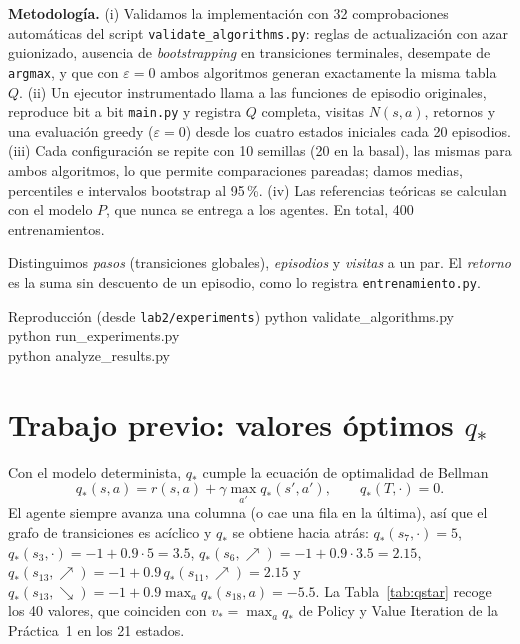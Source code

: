 \documentclass[11pt,a4paper]{article}
\newcommand{\UR}{{\nearrow}}
\newcommand{\DR}{{\searrow}}
\begin{document}
\textbf{Metodología.} (i) Validamos la implementación con 32 comprobaciones automáticas del script \texttt{validate\_\allowbreak algorithms.py}: reglas de actualización con azar guionizado, ausencia de \emph{bootstrapping} en transiciones terminales, desempate de \texttt{argmax}, y que con $\varepsilon=0$ ambos algoritmos generan exactamente la misma tabla $Q$. (ii) Un ejecutor instrumentado llama a las funciones de episodio originales, reproduce bit a bit \texttt{main.py} y registra $Q$ completa, visitas $N(s,a)$, retornos y una evaluación greedy ($\varepsilon=0$) desde los cuatro estados iniciales cada 20 episodios. (iii) Cada configuración se repite con 10 semillas (20 en la basal), las mismas para ambos algoritmos, lo que permite comparaciones pareadas; damos medias, percentiles e intervalos bootstrap al 95\,\%. (iv) Las referencias teóricas se calculan con el modelo $P$, que nunca se entrega a los agentes. En total, 400 entrenamientos.

Distinguimos \emph{pasos} (transiciones globales), \emph{episodios} y \emph{visitas} a un par. El \emph{retorno} es la suma sin descuento de un episodio, como lo registra \texttt{entrenamiento.py}.

\begin{comando}{Reproducción (desde \texttt{lab2/experiments})}
\ttfamily\small python validate\_algorithms.py\\ python run\_experiments.py\\ python analyze\_results.py
\end{comando}

\section{Trabajo previo: valores óptimos \texorpdfstring{$q_*$}{q*}}

Con el modelo determinista, $q_*$ cumple la ecuación de optimalidad de Bellman
\begin{equation}
q_*(s,a)=r(s,a)+\gamma\max_{a'}q_*(s',a'),\qquad q_*(T,\cdot)=0 .
\label{eq:bellman}
\end{equation}
El agente siempre avanza una columna (o cae una fila en la última), así que el grafo de transiciones es acíclico y $q_*$ se obtiene hacia atrás: $q_*(s_7,\cdot)=5$, $q_*(s_3,\cdot)=-1+0.9\cdot 5=3.5$, $q_*(s_6,\UR)=-1+0.9\cdot3.5=2.15$, $q_*(s_{13},\UR)=-1+0.9\,q_*(s_{11},\UR)=2.15$ y $q_*(s_{13},\DR)=-1+0.9\max_{a}q_*(s_{18},a)=-5.5$. La Tabla~\ref{tab:qstar} recoge los 40 valores, que coinciden con $v_*=\max_a q_*$ de Policy y Value Iteration de la Práctica~1 en los 21 estados.
\end{document}
